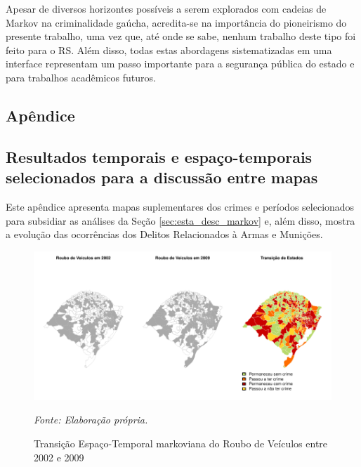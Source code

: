 \documentclass[12pt,openright,oneside,a4paper,english,french,spanish]{abntex2}
\numberwithin{table}{section} %
\numberwithin{figure}{section} %
\newcommand{\source}[1]{\textit{#1}}
\begin{document}
Apesar de diversos horizontes possíveis a serem explorados com cadeias de Markov na criminalidade gaúcha, acredita-se na importância do pioneirismo do presente trabalho, uma vez que, até onde se sabe, nenhum trabalho deste tipo foi feito para o RS. Além disso, todas estas abordagens sistematizadas em uma interface representam um passo importante para a segurança pública do estado e para trabalhos acadêmicos futuros.






\begin{subappendices}
\chapter*{Apêndice}
\section{Resultados temporais e espaço-temporais selecionados para a discussão entre mapas\label{appen:mapas_markov}}

Este apêndice apresenta mapas suplementares dos crimes e períodos selecionados para subsidiar as análises da Seção \ref{sec:esta_desc_markov} e, além disso, mostra a evolução das ocorrências dos Delitos Relacionados à Armas e Munições.

\begin{figure}[H]
\begin{center}
\includegraphics{TESE_DE_DOUTORADO_RENAN_FINAL-map_roub_vei_2002_2009}
\end{center}
\caption{Transição Espaço-Temporal markoviana do Roubo de Veículos entre 2002 e 2009}
\source{Fonte: Elaboração própria.}
\label{fig:mapas_roub_vei_markov_2002_2009}
\end{figure}



\end{subappendices}
\end{document}
